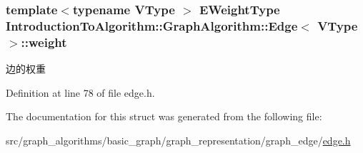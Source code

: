 \hypertarget{struct_introduction_to_algorithm_1_1_graph_algorithm_1_1_edge_a139b40cb4524df195804bdce7a117164}{}
\subsubsection[{weight}]{\setlength{\rightskip}{0pt plus 5cm}template$<$typename V\+Type $>$ {\bf E\+Weight\+Type} {\bf Introduction\+To\+Algorithm\+::\+Graph\+Algorithm\+::\+Edge}$<$ V\+Type $>$\+::weight}\label{struct_introduction_to_algorithm_1_1_graph_algorithm_1_1_edge_a139b40cb4524df195804bdce7a117164}
边的权重 

Definition at line 78 of file edge.\+h.



The documentation for this struct was generated from the following file\+:\begin{DoxyCompactItemize}
\item 
src/graph\+\_\+algorithms/basic\+\_\+graph/graph\+\_\+representation/graph\+\_\+edge/\hyperlink{edge_8h}{edge.\+h}\end{DoxyCompactItemize}
